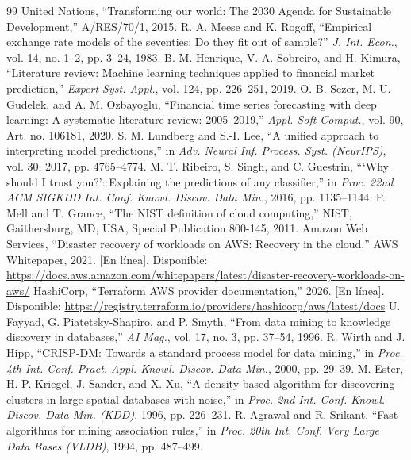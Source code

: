 \documentclass[conference]{IEEEtran}
\begin{document}
\begin{thebibliography}{99}
 United Nations, ``Transforming our world: The 2030 Agenda for Sustainable Development,'' A/RES/70/1, 2015.
 R. A. Meese and K. Rogoff, ``Empirical exchange rate models of the seventies: Do they fit out of sample?'' \emph{J. Int. Econ.}, vol. 14, no. 1--2, pp. 3--24, 1983.
 B. M. Henrique, V. A. Sobreiro, and H. Kimura, ``Literature review: Machine learning techniques applied to financial market prediction,'' \emph{Expert Syst. Appl.}, vol. 124, pp. 226--251, 2019.
 O. B. Sezer, M. U. Gudelek, and A. M. Ozbayoglu, ``Financial time series forecasting with deep learning: A systematic literature review: 2005--2019,'' \emph{Appl. Soft Comput.}, vol. 90, Art. no. 106181, 2020.
 S. M. Lundberg and S.-I. Lee, ``A unified approach to interpreting model predictions,'' in \emph{Adv. Neural Inf. Process. Syst. (NeurIPS)}, vol. 30, 2017, pp. 4765--4774.
 M. T. Ribeiro, S. Singh, and C. Guestrin, ```Why should I trust you?': Explaining the predictions of any classifier,'' in \emph{Proc. 22nd ACM SIGKDD Int. Conf. Knowl. Discov. Data Min.}, 2016, pp. 1135--1144.
 P. Mell and T. Grance, ``The NIST definition of cloud computing,'' NIST, Gaithersburg, MD, USA, Special Publication 800-145, 2011.
 Amazon Web Services, ``Disaster recovery of workloads on AWS: Recovery in the cloud,'' AWS Whitepaper, 2021. [En línea]. Disponible: \url{https://docs.aws.amazon.com/whitepapers/latest/disaster-recovery-workloads-on-aws/}
 HashiCorp, ``Terraform AWS provider documentation,'' 2026. [En línea]. Disponible: \url{https://registry.terraform.io/providers/hashicorp/aws/latest/docs}
 U. Fayyad, G. Piatetsky-Shapiro, and P. Smyth, ``From data mining to knowledge discovery in databases,'' \emph{AI Mag.}, vol. 17, no. 3, pp. 37--54, 1996.
 R. Wirth and J. Hipp, ``CRISP-DM: Towards a standard process model for data mining,'' in \emph{Proc. 4th Int. Conf. Pract. Appl. Knowl. Discov. Data Min.}, 2000, pp. 29--39.
 M. Ester, H.-P. Kriegel, J. Sander, and X. Xu, ``A density-based algorithm for discovering clusters in large spatial databases with noise,'' in \emph{Proc. 2nd Int. Conf. Knowl. Discov. Data Min. (KDD)}, 1996, pp. 226--231.
 R. Agrawal and R. Srikant, ``Fast algorithms for mining association rules,'' in \emph{Proc. 20th Int. Conf. Very Large Data Bases (VLDB)}, 1994, pp. 487--499.

\end{thebibliography}
\end{document}
